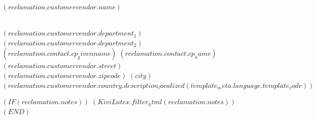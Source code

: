 \documentclass[paper=a4,fontsize=10pt]{scrartcl}
\begin{document}
\begin{letter}{
  $( reclamation.customervendor.name )$         \strut\\
  $( reclamation.customervendor.department_1 )$ \ifhmode\\\fi
  $( reclamation.customervendor.department_2 )$ \ifhmode\\\fi
  $( reclamation.contact.cp_givenname )$ $( reclamation.contact.cp_name )$ \ifhmode\\\fi
  $( reclamation.customervendor.street )$       \ifhmode\\\fi
  $( reclamation.customervendor.zipcode )$ $( city )$ \ifhmode\\\fi
  $( reclamation.customervendor.country.description_localized(template_meta.language.template_code) )$      %
    }

    \opening{
    }
    \thispagestyle{kivitendo.letter.first}

    \vkreklamationsformel

    $( IF (reclamation.notes) )$%
    $( KiviLatex.filter_html(reclamation.notes) )$%
      \medskip
    $( END )$%


\end{letter}
\end{document}
